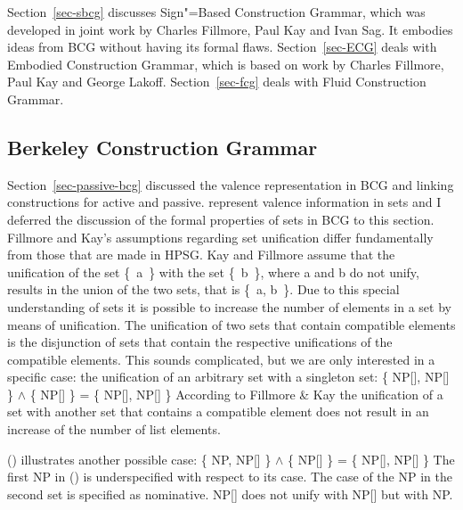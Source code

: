 Section~\ref{sec-sbcg} discusses Sign"=Based Construction Grammar, which was developed in joint work
by Charles Fillmore, Paul Kay and Ivan Sag. It embodies ideas from BCG without having its formal flaws. Section~\ref{sec-ECG} deals with
Embodied Construction Grammar, which is based on work by Charles Fillmore, Paul Kay and George
Lakoff. Section~\ref{sec-fcg} deals with Fluid Construction Grammar.


\subsection{Berkeley Construction Grammar}
\label{sec-formal-bcg}

\largerpage
Section~\ref{sec-passive-bcg} discussed the valence representation in BCG and linking constructions for active and
passive.  represent valence information in sets
and I deferred the discussion of the formal properties of sets in BCG to this section.
Fillmore and Kay's assumptions regarding set unification differ fundamentally from those that are
made in HPSG. Kay and Fillmore assume that the unification of the set \{~a~\} with the set  \mbox{\{ b \}},
where a and b do not unify, results in the union of the two sets, that is \{~a, b~\}. Due to this
special understanding of sets it is possible to increase the number of elements in a set by means of
unification. The unification of two sets that contain compatible elements is the disjunction of sets
that contain the respective unifications of the compatible elements. This sounds complicated, but we
are only interested in a specific case: the unification of an arbitrary set with a singleton set:
\ea
\{ NP[], NP[] \} $\wedge$ \{ NP[] \} = \{ NP[], NP[] \}
\z
According to Fillmore \& Kay the unification of a set with another set that contains a compatible
element does not result in an increase of the number of list elements.

\noindent
() illustrates another possible case:
\ea
\{ NP, NP[] \} $\wedge$ \{ NP[] \} = \{ NP[], NP[] \}
\z
The first NP in () is underspecified with respect to its case. The case of the NP in the
second set is specified as nominative. NP[] does not unify with NP[] but with NP.

